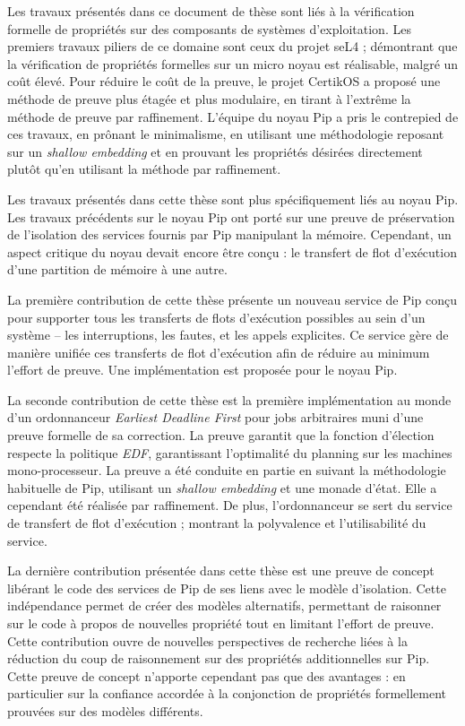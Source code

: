 
Les travaux présentés dans ce document de thèse sont liés à la vérification formelle de propriétés sur des composants de systèmes d'exploitation. Les premiers travaux piliers de ce domaine sont ceux du projet seL4 ; démontrant que la vérification de propriétés formelles sur un micro noyau est réalisable, malgré un coût élevé. Pour réduire le coût de la preuve, le projet CertikOS a proposé une méthode de preuve plus étagée et plus modulaire, en tirant à l'extrême la méthode de preuve par raffinement. L'équipe du noyau Pip a pris le contrepied de ces travaux, en prônant le minimalisme, en utilisant une méthodologie reposant sur un \emph{shallow embedding} et en prouvant les propriétés désirées directement plutôt qu'en utilisant la méthode par raffinement.

Les travaux présentés dans cette thèse sont plus spécifiquement liés au noyau Pip. Les travaux précédents sur le noyau Pip ont porté sur une preuve de préservation de l'isolation des services fournis par Pip manipulant la mémoire. Cependant, un aspect critique du noyau devait encore être conçu : le transfert de flot d'exécution d'une partition de mémoire à une autre.

La première contribution de cette thèse présente un nouveau service de Pip conçu pour supporter tous les transferts de flots d'exécution possibles au sein d'un système -- les interruptions, les fautes, et les appels explicites. Ce service gère de manière unifiée ces transferts de flot d'exécution afin de réduire au minimum l'effort de preuve. Une implémentation est proposée pour le noyau Pip.

La seconde contribution de cette thèse est la première implémentation au monde d'un ordonnanceur \emph{Earliest Deadline First} pour jobs arbitraires muni d'une preuve formelle de sa correction. La preuve garantit que la fonction d'élection respecte la politique \emph{EDF}, garantissant l'optimalité du planning sur les machines mono-processeur. La preuve a été conduite en partie en suivant la méthodologie habituelle de Pip, utilisant un \emph{shallow embedding} et une monade d'état. Elle a cependant été réalisée par raffinement. De plus, l'ordonnanceur se sert du service de transfert de flot d'exécution ; montrant la polyvalence et l'utilisabilité du service.

La dernière contribution présentée dans cette thèse est une preuve de concept libérant le code des services de Pip de ses liens avec le modèle d'isolation. Cette indépendance permet de créer des modèles alternatifs, permettant de raisonner sur le code à propos de nouvelles propriété tout en limitant l'effort de preuve. Cette contribution ouvre de nouvelles perspectives de recherche liées à la réduction du coup de raisonnement sur des propriétés additionnelles sur Pip. Cette preuve de concept n'apporte cependant pas que des avantages : en particulier sur la confiance accordée à la conjonction de propriétés formellement prouvées sur des modèles différents.
